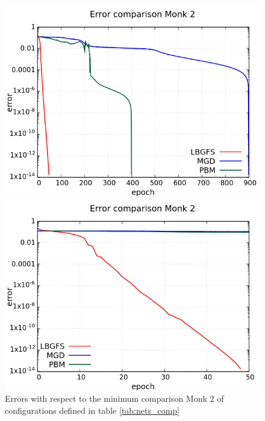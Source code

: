 \begin{figure}[H]
	\centering
	\begin{minipage}[t]{0.5\linewidth}
		\includegraphics[width=\linewidth]{data/Comparison/Monk2/Monk2_R_Comparison_log_standard.png}
	\end{minipage}%
	\begin{minipage}[t]{0.5\linewidth}
		\includegraphics[width=\linewidth]{data/Comparison/Monk2/Monk2_R_Comparison_log_zoom.png}
	\end{minipage}
	\caption{Errors with respect to the minimum comparison Monk 2 of configurations defined in table \ref{tab:nets_comp}}
	\label{R-Monk2}
\end{figure}
